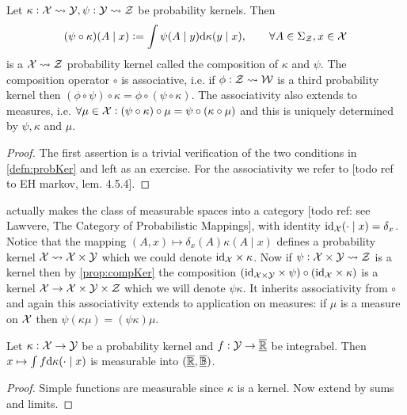 \documentclass{article}
\begin{document}
\begin{prop}
  Let $\kappa : \mathcal{X} \leadsto \mathcal{Y}, \psi : \mathcal{Y} \leadsto \mathcal{Z}$
  be probability kernels. Then
  \[ (\psi \circ \kappa)(A \mid x) \vcentcolon=
    \int \psi(A \mid y) \mathrm{d} \kappa(y \mid x)
  ,\qquad \forall A \in \Sigma_{\mathcal{Z}}, x \in \mathcal{X} \]
  is a $\mathcal{X} \leadsto \mathcal{Z}$ probability kernel called the
  composition of $\kappa$ and $\psi$. The composition operator
  $\circ$ is associative, i.e. if $\phi : \mathcal{Z} \leadsto \mathcal{W}$ is
  a third probability kernel then $(\phi \circ \psi) \circ \kappa = 
  \phi \circ (\psi \circ \kappa)$.
  The associativity also extends to measures, i.e.
  $\forall \mu \in \mathcal{X}
  : (\psi \circ \kappa) \circ \mu = \psi \circ (\kappa \circ \mu) $
  and this is uniquely determined by $\psi, \kappa$ and $\mu$.
  \label{prop:compKer}
\end{prop}
\begin{proof}
  The first assertion is a trivial verification of the two conditions
  in \cref{defn:probKer} and left as an exercise.
  For the associativity we refer to [todo ref to EH markov, lem. 4.5.4].
\end{proof}

 actually makes the class of measurable spaces
into a category [todo ref: see Lawvere, The Category of Probabilistic
Mappings], with identity $\text{id}_{\mathcal{X}}(\cdot \mid x) = \delta_x$.
Notice that the mapping $(A, x) \mapsto \delta_x(A) \kappa(A \mid x)$
defines a probability kernel $\mathcal{X} \leadsto \mathcal{X} \times \mathcal{Y}$
which we could denote $\text{id}_{\mathcal{X}} \times \kappa$.
Now if $\psi : \mathcal{X} \times \mathcal{Y} \leadsto \mathcal{Z}$ is a kernel
then by \cref{prop:compKer} the composition
$(\text{id}_{\mathcal{X} \times \mathcal{Y}} \times \psi)
\circ (\text{id}_{\mathcal{X}} \times \kappa)$
is a kernel $\mathcal{X} \to \mathcal{X} \times \mathcal{Y} \times \mathcal{Z}$
which we will denote $\psi \kappa$.
It inherits associativity from $\circ$ and again this associativity
extends to application on measures: if $\mu$ is a measure on $\mathcal{X}$
then $\psi (\kappa \mu) = (\psi \kappa) \mu$.

\begin{prop}
  Let $\kappa : \mathcal{X} \to \mathcal{Y}$ be a probability kernel
  and $f : \mathcal{Y} \to \overline{\underline{\mathbb{R}}}$ be integrabel.
  Then $x \mapsto \int f \mathrm{d} \kappa(\cdot \mid x)$ is measurable
  into $(\overline{\underline{\mathbb{R}}}, \overline{\underline{\mathbb{B}}})$.
  \label{prop:intKerMeas}
\end{prop}
\begin{proof}
  Simple functions are measurable since $\kappa$ is a kernel.
  Now extend by sums and limits.
\end{proof}
\end{document}
